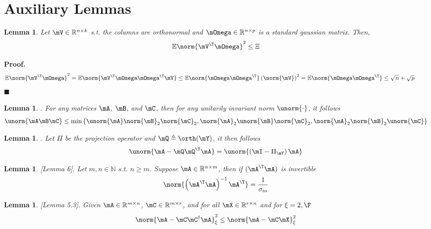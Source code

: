\documentclass[10pt]{article}
\theoremstyle{plain}
\newtheorem{lemma}[theorem]{Lemma}
\theoremstyle{definition}
\theoremstyle{remark}
\begin{document}
\section{Auxiliary Lemmas}
\begin{lemma} \label{lem:gaussian-projection-spectral-square}
	Let $\mV \in \mathbb{R}^{n \times k}$ s.t. the columns are orthonormal and $\mOmega \in \mathbb{R}^{n \times p}$ is a standard gaussian matrix. Then, 
	\begin{equation}
		\mathbb{E}\norm{\mV^{\T}\mOmega}^2 \leq \Xi
	\end{equation}
\end{lemma}
{\bf Proof.}
\begin{align}
	\mathbb{E}\norm{\mV^{\T}\mOmega}^2 &= \mathbb{E}\norm{\mV^{\T}\mOmega\mOmega^{\T}\mV} \leq \mathbb{E}\norm{\mOmega\mOmega^{\T}}\left(\norm{\mV}\right)^2 = \mathbb{E}\norm{\mOmega\mOmega^{\T}} \leq \sqrt{n}+\sqrt{p}&&
\end{align}
\hfill $\blacksquare$
\begin{lemma} \label{lem:mirsky}
	\cite{mirsky:1960}. 
	For any matrices $\mA$, $\mB$, and $\mC$, then for any unitarily invariant norm $\unorm{\cdot}$, it follows
	\begin{equation}
		\unorm{\mA \mB \mC} \leq \min\left\{\unorm{\mA}\norm{\mB}_2\norm{\mC}_2,\norm{\mA}_2 \unorm{\mB} \norm{\mC}_2,\norm{\mA}_2\norm{\mB}_2\unorm{\mC}\right\}
	\end{equation}
\end{lemma}
\begin{lemma} \label{lem:hmt}
	\cite{halko:2011}.
	Let $\Pi$ be the projection operator and $\mQ \triangleq \orth(\mY)$, it then follows
	\begin{equation}
		\unorm{\mA - \mQ\mQ^{\T}\mA} = \unorm{\left(\mI - \Pi_{\mY}\right)\mA}
	\end{equation}
\end{lemma}
\begin{lemma} \label{lem:martinsson-lemma-6}
    \cite{woolfe:2006}[Lemma 6]. 
    Let $m, n \in \mathbb{N}$ s.t. $n \geq m$. Suppose $\mA \in \mathbb{R}^{n \times m}$, then if $(\mA^{\T}\mA)$ is invertible
    \begin{equation}
    \norm{\left(\mA^{\T}\mA\right)^{-1}\mA^{\T}} = \frac{1}{\sigma_{m}}
    \end{equation}
\end{lemma}
\begin{lemma}
	\label{lem:boutsidis-5.3}
	\cite{boutsidis:2013}[Lemma 5.3]. 
	Given $\mA \in \mathbb{R}^{m \times n}$, $\mC \in \mathbb{R}^{m \times r}$, and for all $\mX \in \mathbb{R}^{r \times n}$ and for $\xi = 2,\F$
	\begin{equation}
		\norm{\mA - \mC\mC^{\dagger}\mA}_{\xi}^2 \leq \norm{\mA - \mC \mX}_{\xi}^2
	\end{equation}
\end{lemma}
\end{document}

